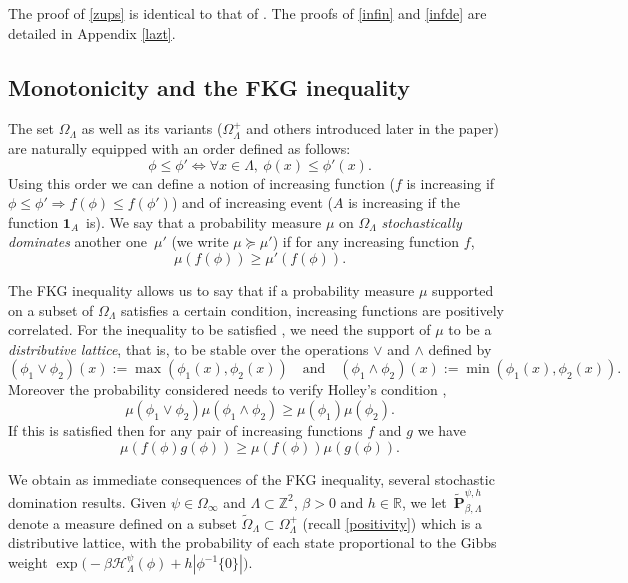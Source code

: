 \documentclass[JEP,XML,SOM,Unicode, NoFloatCountersInSection]{cedram}
\let\mathcal\mathscr
\numberwithin{equation}{section}
\theoremstyle{plain}
\theoremstyle{definition}
\newcommand{\ind}{\mathbf{1}}
\newcommand{\cH}{{\ensuremath{\mathcal H}} }
\newcommand{\bP}{{\ensuremath{\mathbf P}} }
\newcommand{\bbR}{{\ensuremath{\mathbb R}} }
\newcommand{\bbZ}{{\ensuremath{\mathbb Z}} }
\newcommand{\gb}{\beta}
\newcommand{\gO}{\Omega}
\newcommand{\gL}{\Lambda}
\begin{document}
The proof of \eqref{zups} is identical to that of \cite[Prop.\,4.5]{cf:part1}. The proofs of \eqref{infin} and \eqref{infde} are detailed in Appendix \ref{lazt}.

\subsection{Monotonicity and the FKG inequality}

The set $\gO_{\gL}$ as well as its variants ($\gO^+_{\gL}$ and others introduced later in the paper) are naturally equipped with an order defined as follows:
\[
\phi\le \phi' \iff \forall x\in \gL,\ \phi(x)\le \phi'(x).
\]
Using this order we can define a notion of increasing function ($f$ is increasing if $\phi\le \phi'\Rightarrow f(\phi)\le f(\phi')$) and of increasing event
($A$ is increasing if the function $\ind_A$~is).
We say that a probability measure $\mu$ on $\gO_{\gL}$ \textit{stochastically dominates} another one~$\mu'$ (we write $\mu \succcurlyeq \mu'$) if for any increasing function $f$,
\[
\mu(f(\phi))\ge \mu'(f(\phi)).
\]

The FKG inequality allows us to say that if a probability measure $\mu$ supported on a subset of $\gO_{\gL}$ satisfies a certain condition,
increasing functions are positively correlated.
For the inequality to be satisfied \cite{cf:Holley}, we need the support of $\mu$ to be a \textit{distributive lattice}, that is, to
be stable over the operations $\vee$ and $\wedge$
defined by
\[
(\phi_1\vee \phi_2)(x):=\max(\phi_1(x),\phi_2(x)) \quad\text{and}\quad(\phi_1\wedge \phi_2)(x):=\min(\phi_1(x),\phi_2(x)).
\]
Moreover the probability considered needs to verify Holley's condition \cite[Eq.\,(7)]{cf:Holley},
\begin{equation*}%
\mu(\phi_1\vee \phi_2) \mu(\phi_1\wedge \phi_2)\ge \mu(\phi_1)\mu(\phi_2).
\end{equation*}
If this is satisfied then for any pair of increasing functions $f$ and $g$ we have
\begin{equation*}%
\mu(f(\phi)g(\phi))\ge \mu(f(\phi)) \mu(g(\phi)).
\end{equation*}

We obtain as immediate consequences of the FKG inequality, several stochastic domination results.
Given $\psi\in \gO_{\infty}$ and $\gL\subset \bbZ^2$, $\gb>0$ and $h\in \bbR$,
we let~$\tilde \bP^{\psi,h}_{\gb,\gL}$ denote a measure defined on a subset $\tilde \gO_\gL \subset \gO^+_{\gL}$ (recall \eqref{positivity}) which is a
distributive lattice, with the probability of each state proportional to the Gibbs weight
\hbox{$\exp\bigl(-\gb\cH^\psi_\gL(\phi)+ h|\phi^{-1}\{0\}|\bigr)$}.
\end{document}
